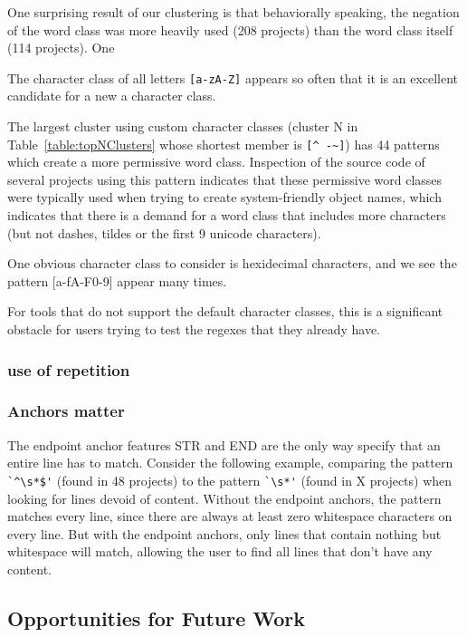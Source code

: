 

One surprising result of our clustering is that behaviorally speaking, the negation of the word class was more heavily used (208 projects) than the word class itself (114 projects).  One

The character class of all letters \verb![a-zA-Z]! appears so often that it is an excellent candidate for a new a character class.

The largest cluster using custom character classes (cluster N in Table~\ref{table:topNClusters} whose shortest member is \verb•[^ -~]•) has 44 patterns which create a more permissive word class.  Inspection of the source code of several projects using this pattern indicates that these permissive word classes were typically used when trying to create system-friendly object names, which indicates that there is a demand for a word class that includes more characters (but not dashes, tildes or the first 9 unicode characters).




One obvious character class to consider is hexidecimal characters, and we see the pattern [a-fA-F0-9] appear many times.

For tools that do not support the default character classes, this is a significant obstacle for users trying to test the regexes that they already have.

\subsubsection{use of repetition}


\subsubsection{Anchors matter}
The endpoint anchor features STR and END are the only way specify that an entire line has to match.  Consider the following example, comparing the pattern \verb!`^\s*$'! (found in 48 projects) to the pattern \verb!`\s*'! (found in X projects) when looking for lines devoid of content.  Without the endpoint anchors, the pattern matches every line, since there are always at least zero whitespace characters on every line.  But with the endpoint anchors, only lines that contain nothing but whitespace will match, allowing the user to find all lines that don't have any content.



\subsection{Opportunities for Future Work}



